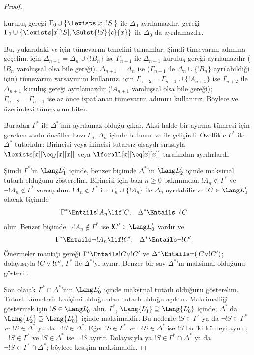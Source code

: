 \documentclass[../../../include/open-logic-section]{subfiles}
\begin{document}
\begin{proof}
\begin{enumerate}
  kuruluş gereği $\Gamma_0\cup\{\lexists[x][!S]\}$ ile $\Delta_0$
  ayrılamazdır.  gereği
  $\Gamma_0\cup\{\lexists[x][!S],\Subst{!S}{c}{x}\}$ ile
  $\Delta_0$ da ayrılamazdır.
\end{enumerate}
Bu, yukarıdaki  ve  için tümevarım temelini
tamamlar. Şimdi tümevarım adımına geçelim.  için
$\Delta_{n+1}=\Delta_n\cup\{!B_n\}$ ise $\Gamma_{n+1}$ ile
$\Delta_{n+1}$ kuruluş gereği ayrılamazdır ($!B_n$ varoluşsal olsa
bile  gereği). $\Delta_{n+1}=\Delta_n$ ise
($\Gamma_{n+1}$ ile $\Delta_n\cup\{!B_n\}$ ayrılabildiği için)
 tümevarım varsayımını kullanırız.  için
$\Gamma_{n+2}=\Gamma_{n+1}\cup\{!A_{n+1}\}$ ise $\Gamma_{n+2}$ ile
$\Delta_{n+1}$ kuruluş gereği ayrılamazdır ($!A_{n+1}$ varoluşsal
olsa bile  gereği); $\Gamma_{n+2}=\Gamma_{n+1}$
ise az önce ispatlanan  tümevarım adımını kullanırız.
Böylece  ve  üzerindeki tümevarım biter.

Buradan $\Gamma^*$ ile $\Delta^*$'nın ayrılamaz olduğu çıkar. Aksi
halde bir ayırma tümcesi için gereken sonlu öncüller bazı
$\Gamma_n,\Delta_n$ içinde bulunur ve  ile çelişirdi.
Özellikle $\Gamma^*$ ile $\Delta^*$ tutarlıdır: Birincisi veya ikincisi
tutarsız olsaydı sırasıyla $\lexists[x][\eq/[x][x]]$ veya
$\lforall[x][\eq[x][x]]$ tarafından ayrılırlardı.

Şimdi $\Gamma^*$'ın $\Lang L'_1$ içinde, benzer biçimde $\Delta^*$'ın
$\Lang L'_2$ içinde maksimal tutarlı olduğunu gösterelim. Birincisi
için bazı $n\geq0$ bakımından $!A_n\notin\Gamma^*$ ve
$\lnot !A_n\notin\Gamma^*$ varsayalım. $!A_n\notin\Gamma^*$ ise
$\Gamma_n\cup\{!A_n\}$ ile $\Delta_n$ ayrılabilir ve
$!C\in\Lang L'_0$ olacak biçimde
\begin{align*}
  \Gamma^* & \Entails !A_n \lif !C, &
  \Delta^* & \Entails \lnot !C
\end{align*}
olur. Benzer biçimde $\lnot !A_n\notin\Gamma^*$ ise
$!C'\in\Lang L'_0$ vardır ve
\begin{align*}
  \Gamma^* & \Entails \lnot !A_n \lif !C', &
  \Delta^* & \Entails \lnot !C'.
\end{align*}
Önermeler mantığı gereği $\Gamma^*\Entails !C\lor !C'$ ve
$\Delta^*\Entails\lnot(!C\lor !C')$; dolayısıyla $!C\lor !C'$,
$\Gamma^*$ ile $\Delta^*$'yı ayırır. Benzer bir sav $\Delta^*$'ın
maksimal olduğunu gösterir.

Son olarak $\Gamma^*\cap\Delta^*$'nın $\Lang L'_0$ içinde maksimal
tutarlı olduğunu gösterelim. Tutarlı kümelerin kesişimi olduğundan
tutarlı olduğu açıktır. Maksimalliği göstermek için
$!S\in\Lang L'_0$ alın. $\Gamma^*$,
$\Lang{L'_1}\supseteq\Lang{L'_0}$ içinde; $\Delta^*$ da
$\Lang{L'_2}\supseteq\Lang{L'_0}$ içinde maksimaldir. Bu nedenle
$!S\in\Gamma^*$ ya da $\lnot !S\in\Gamma^*$ ve
$!S\in\Delta^*$ ya da $\lnot !S\in\Delta^*$. Eğer
$!S\in\Gamma^*$ ve $\lnot !S\in\Delta^*$ ise $!S$ bu iki kümeyi
ayırır; $\lnot !S\in\Gamma^*$ ve $!S\in\Delta^*$ ise $\lnot !S$
ayırır. Dolayısıyla ya $!S\in\Gamma^*\cap\Delta^*$ ya da
$\lnot !S\in\Gamma^*\cap\Delta^*$; böylece kesişim maksimaldir.


\end{proof}
\end{document}
